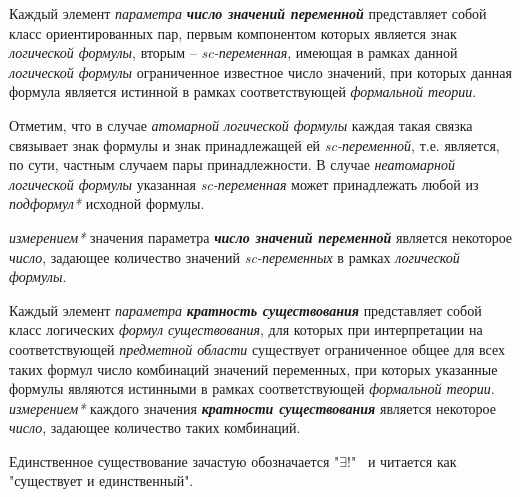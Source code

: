 Каждый элемент \textit{параметра} \textbf{\textit{число значений переменной}} представляет собой класс ориентированных пар, первым компонентом которых является знак \textit{логической формулы}, вторым -- \textit{sc-переменная}, имеющая в рамках данной \textit{логической формулы} ограниченное известное число значений, при которых данная формула является истинной в рамках соответствующей \textit{формальной теории}.

Отметим, что в случае \textit{атомарной логической формулы} каждая такая связка связывает знак формулы и знак принадлежащей ей \textit{sc-переменной}, т.е. является, по сути, частным случаем пары принадлежности. В случае \textit{неатомарной логической формулы} указанная \textit{sc-переменная} может принадлежать любой из \textit{подформул*} исходной формулы.

\textit{измерением*} значения параметра \textbf{\textit{число значений переменной}} является некоторое \textit{число}, задающее количество значений \textit{sc-переменных} в рамках \textit{логической формулы}.

\begin{SCn}
\end{SCn}

Каждый элемент \textit{параметра} \textbf{\textit{кратность существования}} представляет собой класс логических \textit{формул существования}, для которых  при интерпретации на соответствующей \textit{предметной области} существует ограниченное общее для всех таких формул число комбинаций значений переменных, при которых указанные формулы являются истинными в рамках соответствующей \textit{формальной теории}.
\textit{измерением*} каждого значения \textbf{\textit{кратности существования}} является некоторое \textit{число}, задающее количество таких комбинаций.

\begin{SCn}
\end{SCn}

Единственное существование зачастую обозначается "$\exists!$" \ и читается как "существует и единственный".

\begin{SCn}
\end{SCn}

